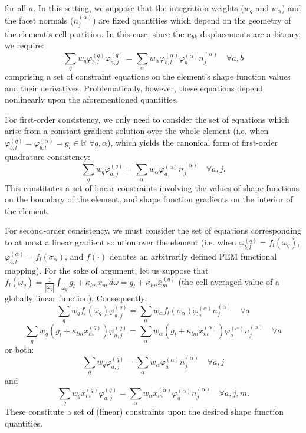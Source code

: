 \documentclass[11pt]{article} %
\begin{document}
for all $a$. In this setting, we suppose that the integration weights ($w_q$ and $w_{\alpha}$) and the facet normals ($n^{(\alpha)}_j$) are fixed quantities which depend on the geometry of the element's cell partition. In this case, since the $u_{bk}$ displacements are arbitrary, we require:
\begin{equation}
	\sum_q w_q \varphi^{(q)}_{b,l} \varphi^{(q)}_{a,j} = \sum_{\alpha} w_{\alpha} \varphi^{(\alpha)}_{b,l} \varphi^{(\alpha)}_a n^{(\alpha)}_j \quad \forall a, b
\end{equation}
comprising a set of constraint equations on the element's shape function values and their derivatives. Problematically, however, these equations depend nonlinearly upon the aforementioned quantities.

For first-order consistency, we only need to consider the set of equations which arise from a constant gradient solution over the whole element (i.e. when $\varphi^{(q)}_{b,l} = \varphi^{(\alpha)}_{b,l} = g_l \in \mathbb{R} \, \, \forall q, \alpha$), which yields the canonical form of first-order quadrature consistency:
\begin{equation}
	\sum_q w_q \varphi^{(q)}_{a,j} = \sum_{\alpha} w_{\alpha} \varphi^{(\alpha)}_a n^{(\alpha)}_j \quad \forall a, j.
\end{equation}
This constitutes a set of linear constraints involving the values of shape functions on the boundary of the element, and shape function gradients on the interior of the element.

For second-order consistency, we must consider the set of equations corresponding to at most a linear gradient solution over the element (i.e. when $\varphi^{(q)}_{b,l} = f_l ( \omega_q )$, $\varphi^{(\alpha)}_{b,l} = f_l ( \sigma_{\alpha} )$, and $f ( \cdot )$ denotes an arbitrarily defined PEM functional mapping). For the sake of argument, let us suppose that $f_l ( \omega_q ) = \frac{1}{| \omega_q |} \int_{\omega_q} g_l + \kappa_{lm} x_m \, d \omega = g_l + \kappa_{lm} \bar{x}^{(q)}_m$ (the cell-averaged value of a globally linear function). Consequently:
\begin{equation}
	\sum_q w_q f_l ( \omega_q ) \varphi^{(q)}_{a,j} = \sum_{\alpha} w_{\alpha} f_l ( \sigma_{\alpha} ) \varphi^{(\alpha)}_a n^{(\alpha)}_j \quad \forall a
\end{equation}
\begin{equation}
	\sum_q w_q (g_l + \kappa_{lm} \bar{x}^{(q)}_m) \varphi^{(q)}_{a,j} = \sum_{\alpha} w_{\alpha} (g_l + \kappa_{lm} \bar{x}^{(\alpha)}_m) \varphi^{(\alpha)}_a n^{(\alpha)}_j \quad \forall a
\end{equation}
or both:
\begin{equation}
	\sum_q w_q \varphi^{(q)}_{a,j} = \sum_{\alpha} w_{\alpha} \varphi^{(\alpha)}_a n^{(\alpha)}_j \quad \forall a, j
\end{equation}
and
\begin{equation}
	\sum_q w_q \bar{x}^{(q)}_m \varphi^{(q)}_{a,j} = \sum_{\alpha} w_{\alpha} \bar{x}^{(\alpha)}_m \varphi^{(\alpha)}_a n^{(\alpha)}_j \quad \forall a, j, m.
\end{equation}
These constitute a set of (linear) constraints upon the desired shape function quantities.
\end{document}
